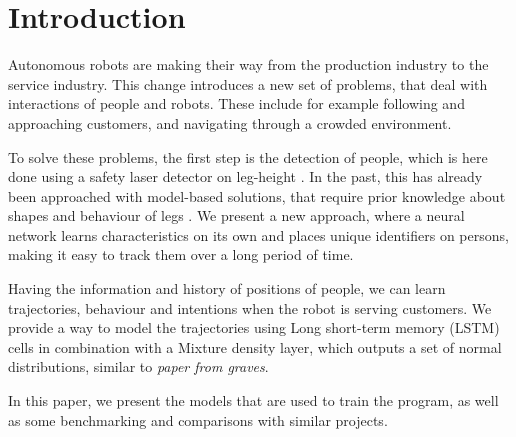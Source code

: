 \section{Introduction}

Autonomous robots are making their way from the production industry to the service industry. This change introduces a new set of problems, that deal with interactions of people and robots. These include for example following and approaching customers, and navigating through a crowded environment. 

To solve these problems, the first step is the detection of people, which is here done using a safety laser detector on leg-height . In the past, this has already been approached with model-based solutions, that require prior knowledge about shapes and behaviour of legs .
We present a new approach, where a neural network learns characteristics on its own and places unique identifiers on persons, making it easy to track them over a long period of time.

Having the information and history of positions of people, we can learn trajectories, behaviour and intentions when the robot is serving customers. We provide a way to model the trajectories using Long short-term memory (LSTM) cells in combination with a Mixture density layer, which outputs a set of normal distributions, similar to \textit{paper from graves}.

In this paper, we present the models that are used to train the program, as well as some benchmarking and comparisons with similar projects.